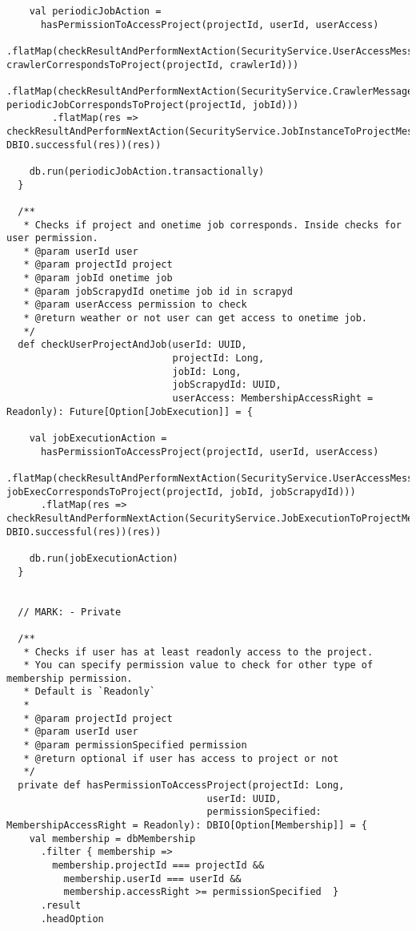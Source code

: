 \begin{lstlisting}
    val periodicJobAction =
      hasPermissionToAccessProject(projectId, userId, userAccess)
        .flatMap(checkResultAndPerformNextAction(SecurityService.UserAccessMessage, crawlerCorrespondsToProject(projectId, crawlerId)))
        .flatMap(checkResultAndPerformNextAction(SecurityService.CrawlerMessage, periodicJobCorrespondsToProject(projectId, jobId)))
        .flatMap(res => checkResultAndPerformNextAction(SecurityService.JobInstanceToProjectMessage, DBIO.successful(res))(res))

    db.run(periodicJobAction.transactionally)
  }

  /**
   * Checks if project and onetime job corresponds. Inside checks for user permission.
   * @param userId user
   * @param projectId project
   * @param jobId onetime job
   * @param jobScrapydId onetime job id in scrapyd
   * @param userAccess permission to check
   * @return weather or not user can get access to onetime job.
   */
  def checkUserProjectAndJob(userId: UUID,
                             projectId: Long,
                             jobId: Long,
                             jobScrapydId: UUID,
                             userAccess: MembershipAccessRight = Readonly): Future[Option[JobExecution]] = {

    val jobExecutionAction =
      hasPermissionToAccessProject(projectId, userId, userAccess)
      .flatMap(checkResultAndPerformNextAction(SecurityService.UserAccessMessage, jobExecCorrespondsToProject(projectId, jobId, jobScrapydId)))
      .flatMap(res => checkResultAndPerformNextAction(SecurityService.JobExecutionToProjectMessage, DBIO.successful(res))(res))

    db.run(jobExecutionAction)
  }


  // MARK: - Private

  /**
   * Checks if user has at least readonly access to the project.
   * You can specify permission value to check for other type of membership permission.
   * Default is `Readonly`
   *
   * @param projectId project
   * @param userId user
   * @param permissionSpecified permission
   * @return optional if user has access to project or not
   */
  private def hasPermissionToAccessProject(projectId: Long,
                                   userId: UUID,
                                   permissionSpecified: MembershipAccessRight = Readonly): DBIO[Option[Membership]] = {
    val membership = dbMembership
      .filter { membership =>
        membership.projectId === projectId &&
          membership.userId === userId &&
          membership.accessRight >= permissionSpecified  }
      .result
      .headOption


\end{lstlisting}
